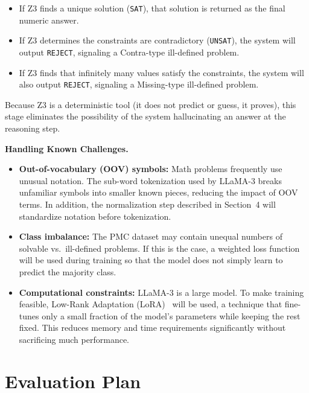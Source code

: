 \documentclass[sigconf, nonacm, onecolumn]{acmart}
\begin{document}
\begin{itemize}
  \item If Z3 finds a unique solution (\texttt{SAT}), that solution is returned as the
  final numeric answer.

  \item If Z3 determines the constraints are contradictory (\texttt{UNSAT}), the system
  will output \texttt{REJECT}, signaling a Contra-type ill-defined problem.

  \item If Z3 finds that infinitely many values satisfy the constraints, the system will
  also output \texttt{REJECT}, signaling a Missing-type ill-defined problem.
\end{itemize}

Because Z3 is a deterministic tool (it does not predict or guess, it proves), this
stage eliminates the possibility of the system hallucinating an answer at the reasoning
step.

\textbf{Handling Known Challenges.}

\begin{itemize}
  \item \textbf{Out-of-vocabulary (OOV) symbols:} Math problems frequently use unusual
  notation. The sub-word tokenization used by LLaMA-3 breaks unfamiliar symbols into
  smaller known pieces, reducing the impact of OOV terms. In addition, the normalization
  step described in Section~4 will standardize notation before tokenization.

  \item \textbf{Class imbalance:} The PMC dataset may contain unequal numbers of solvable
  vs.\ ill-defined problems. If this is the case, a weighted loss function will be used
  during training so that the model does not simply learn to predict the majority class.

  \item \textbf{Computational constraints:} LLaMA-3 is a large model. To make training
  feasible, Low-Rank Adaptation (LoRA)~\cite{hu2022} will be used, a technique that
  fine-tunes only a small fraction of the model's parameters while keeping the rest fixed.
  This reduces memory and time requirements significantly without sacrificing much
  performance.
\end{itemize}

\section{Evaluation Plan}
\end{document}
